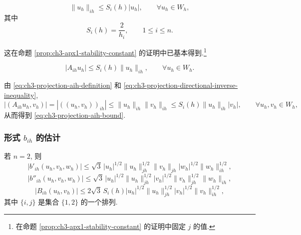 \begin{Lemma}
\label{lem:ch3-projection-directional-inverse-bound}
\begin{equation}
\lVert u_h\rVert_{ih}\leq S_i(h)|u_h|,
\qquad\forall u_h\in W_h,
\label{eq:ch3-projection-directional-inverse-inequality}
\end{equation}
其中
\begin{equation}
S_i(h)=\frac2{h_i},\qquad1\leq i\leq n.
\label{eq:ch3-projection-directional-si}
\end{equation}
\end{Lemma}

\begin{Proof}
这在命题 \ref{prop:ch3-apx1-stability-constant} 的证明中已基本得到.\footnote{在命题 \ref{prop:ch3-apx1-stability-constant} 的证明中固定 $j$ 的值.}
\end{Proof}

\begin{Lemma}
\label{lem:ch3-projection-aih-bound}
\begin{equation}
|A_{ih}u_h|\leq S_i(h)\lVert u_h\rVert_{ih},
\qquad\forall u_h\in W_h.
\label{eq:ch3-projection-aih-bound}
\end{equation}
\end{Lemma}

\begin{Proof}
由 \eqref{eq:ch3-projection-aih-definition} 和 \eqref{eq:ch3-projection-directional-inverse-inequality},
\[
|(A_{ih}u_h,v_h)|=|((u_h,v_h))_{ih}|
\leq\lVert u_h\rVert_{ih}\lVert v_h\rVert_{ih}
\leq S_i(h)\lVert u_h\rVert_{ih}|v_h|,
\qquad\forall u_h,v_h\in W_h,
\]
从而得到 \eqref{eq:ch3-projection-aih-bound}.
\end{Proof}

\subsubsection{形式 $b_{ih}$ 的估计}
\label{subsubsec:ch3-projection-bih-estimates}

\begin{Lemma}
\label{lem:ch3-projection-bih-estimates-two-dimensional}
若 $n=2$, 则
\begin{equation}
|b'_{ih}(u_h,v_h,w_h)|
\leq\sqrt3\,|u_h|^{1/2}\lVert u_h\rVert_{jh}^{1/2}
\lVert v_h\rVert_{jh}|w_h|^{1/2}\lVert w_h\rVert_{ih}^{1/2},
\label{eq:ch3-projection-bih-prime-2d}
\end{equation}
\begin{equation}
|b''_{ih}(u_h,v_h,w_h)|
\leq\sqrt3\,|u_h|^{1/2}\lVert u_h\rVert_{jh}^{1/2}
|v_h|^{1/2}\lVert v_h\rVert_{jh}^{1/2}\lVert w_h\rVert_{ih},
\label{eq:ch3-projection-bih-double-prime-2d}
\end{equation}
\begin{equation}
|B_{ih}(u_h,v_h)|
\leq2\sqrt3\,S_i(h)|u_h|^{1/2}\lVert u_h\rVert_{jh}^{1/2}
|v_h|^{1/2}\lVert v_h\rVert_{ih}^{1/2},
\label{eq:ch3-projection-bih-operator-2d}
\end{equation}
其中 $\{i,j\}$ 是集合 $\{1,2\}$ 的一个排列.
\end{Lemma}

